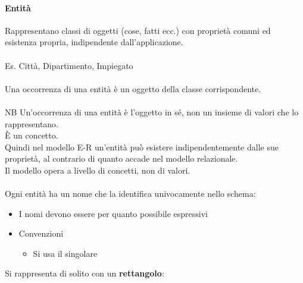 \documentclass[../main.tex]{subfiles}
\begin{document}
	\paragraph{Entità}
	Rappresentano classi di oggetti (cose, fatti ecc.) con proprietà comuni ed esistenza propria, indipendente dall’applicazione.\\\\
	Es. Città, Dipartimento, Impiegato\\\\
	Una occorrenza di una entità è un oggetto della classe corrispondente.\\\\
	NB Un’occorrenza di una entità è l’oggetto in sé, non un insieme di valori che lo rappresentano. \\
	È un concetto. \\
	Quindi nel modello E-R un’entità può esistere indipendentemente dalle sue proprietà, al contrario di quanto accade nel modello relazionale. \\
	Il modello opera a livello di concetti, non di valori.\\\\
	Ogni entità ha un nome che la identifica univocamente nello schema:
	\begin{itemize}
		\item I nomi devono essere per quanto possibile espressivi
		\item Convenzioni
		\begin{itemize}
			\item Si usa il singolare
		\end{itemize}
	\end{itemize}
	Si rappresenta di solito con un \textbf{rettangolo}:
	\begin{center}
	\end{center}
\end{document}
